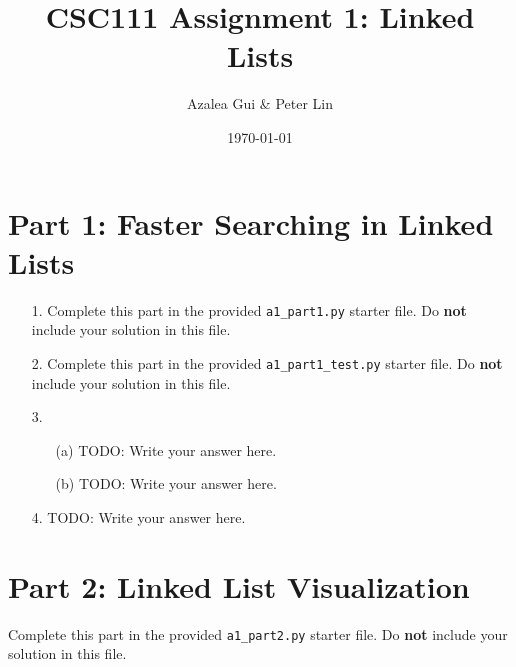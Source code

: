\documentclass[fontsize=11pt]{article}
\title{CSC111 Assignment 1: Linked Lists}
\author{Azalea Gui \& Peter Lin}
\date{\today}
\begin{document}
\maketitle

\section*{Part 1: Faster Searching in Linked Lists}

\begin{enumerate}

\item[1.]
Complete this part in the provided \texttt{a1\_part1.py} starter file.
Do \textbf{not} include your solution in this file.

\item[2.]
Complete this part in the provided \texttt{a1\_part1\_test.py} starter file.
Do \textbf{not} include your solution in this file.

\item[3.]
\begin{enumerate}

    \item[(a)]
    TODO: Write your answer here.

    \item[(b)]
    TODO: Write your answer here.
\end{enumerate}

\item[4.]
TODO: Write your answer here.

\end{enumerate}

\section*{Part 2: Linked List Visualization}
Complete this part in the provided \texttt{a1\_part2.py} starter file.
Do \textbf{not} include your solution in this file.
\end{document}
